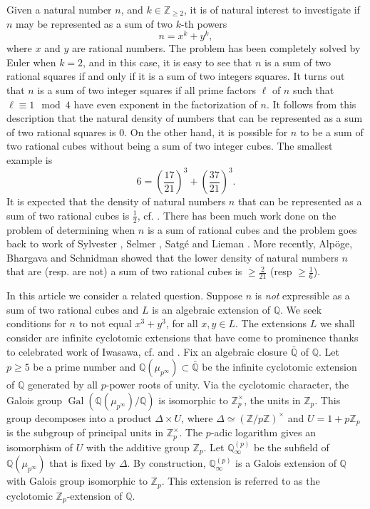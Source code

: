 \documentclass[11pt]{amsart}
\newcommand{\Z}{\mathbb{Z}}
\newcommand{\Q}{\mathbb{Q}}
\newcommand{\op}[1]{\operatorname{#1}}
\numberwithin{equation}{section}
\begin{document}
\par Given a natural number $n$,  and $k\in \Z_{\geq 2}$, it is of natural interest to investigate if $n$ may be represented as a sum of two $k$-th powers
\[n=x^k+y^k,\] where $x$ and $y$ are rational numbers. The problem has been completely solved by Euler when $k=2$,  and in this case,  it is easy to see that $n$ is a sum of two rational squares if and only if it is a sum of two integers squares. It turns out that $n$ is a sum of two integer squares if all prime factors $\ell$ of $n$ such that $\ell\equiv 1\mod{4}$ have even exponent in the factorization of $n$. It follows from this description that the natural density of numbers that can be represented as a sum of two rational squares is $0$. On the other hand,  it is possible for $n$ to be a sum of two rational cubes without being a sum of two integer cubes. The smallest example is 
\[6=\left(\frac{17}{21}\right)^3+\left(\frac{37}{21}\right)^3. \] It is expected that the density of natural numbers $n$ that can be represented as a sum of two rational cubes is $\frac{1}{2}$, cf. \cite{alpoge2022integers}.  There has been much work done on the problem of determining when $n$ is a sum of rational cubes and the problem goes back to work of Sylvester \cite{Sylvester}, Selmer \cite{Selmer}, Satg\'e \cite{satge} and Lieman \cite{Lieman}.  More recently, Alp\"oge, Bhargava and Schnidman \cite{alpoge2022integers} showed that the lower density of natural numbers $n$ that are (resp. are not) a sum of two rational cubes is $\geq \frac{2}{21}$ (resp $\geq \frac{1}{6}$).  

\par In this article we consider a related question. Suppose $n$ is \emph{not} expressible as a sum of two rational cubes and $L$ is an algebraic extension of $\Q$. We seek conditions for $n$ to not equal $x^3+y^3$, for all $x,y\in L$. The extensions $L$ we shall consider are infinite cyclotomic extensions that have come to prominence thanks to celebrated work of Iwasawa, cf. \cite{iwasawa} and \cite[Ch. 13]{washington1997introduction}. Fix an algebraic closure $\bar{\Q}$ of $\Q$. Let $p\geq 5$ be a prime number and $\Q(\mu_{p^\infty})\subset \bar{\Q}$ be the infinite cyclotomic extension of $\Q$ generated by all $p$-power roots of unity.  Via the cyclotomic character,  the Galois group $\op{Gal}(\Q(\mu_{p^\infty})/\Q)$ is isomorphic to $\Z_p^\times$,  the units in $\Z_p$. This group decomposes into a product $\Delta\times U$,  where $\Delta\simeq (\Z/p\Z)^\times$ and $U=1+p\Z_p$ is the subgroup of principal units in $\Z_p^\times$.  The $p$-adic logarithm gives an isomorphism of $U$ with the additive group $\Z_p$.  Let $\Q_\infty^{(p)}$ be the subfield of $\Q(\mu_{p^\infty})$ that is fixed by $\Delta$.  By construction,  $\Q_\infty^{(p)}$ is a Galois extension of $\Q$ with Galois group isomorphic to $\Z_p$.  This extension is referred to as the cyclotomic $\Z_p$-extension of $\Q$. 
\end{document}
